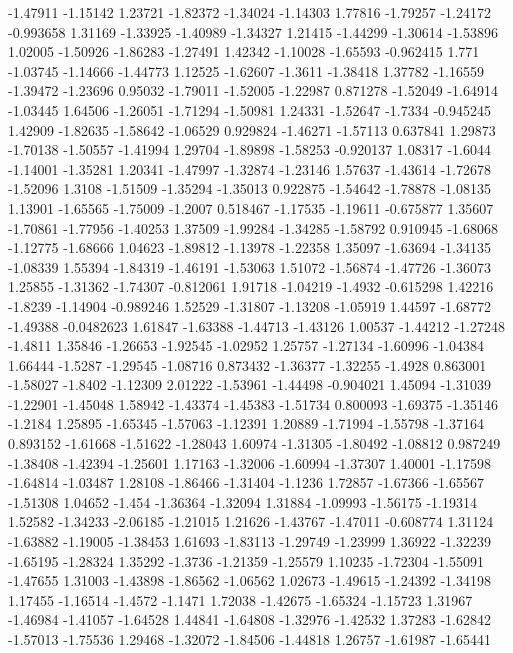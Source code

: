 \documentclass[9pt]{article}
\theoremstyle{plain}
\theoremstyle{definition}
\theoremstyle{remark}
\numberwithin{equation}{section}
\begin{document}
-1.47911
-1.15142
1.23721
-1.82372
-1.34024
-1.14303
1.77816
-1.79257
-1.24172
-0.993658
1.31169
-1.33925
-1.40989
-1.34327
1.21415
-1.44299
-1.30614
-1.53896
1.02005
-1.50926
-1.86283
-1.27491
1.42342
-1.10028
-1.65593
-0.962415
1.771
-1.03745
-1.14666
-1.44773
1.12525
-1.62607
-1.3611
-1.38418
1.37782
-1.16559
-1.39472
-1.23696
0.95032
-1.79011
-1.52005
-1.22987
0.871278
-1.52049
-1.64914
-1.03445
1.64506
-1.26051
-1.71294
-1.50981
1.24331
-1.52647
-1.7334
-0.945245
1.42909
-1.82635
-1.58642
-1.06529
0.929824
-1.46271
-1.57113
0.637841
1.29873
-1.70138
-1.50557
-1.41994
1.29704
-1.89898
-1.58253
-0.920137
1.08317
-1.6044
-1.14001
-1.35281
1.20341
-1.47997
-1.32874
-1.23146
1.57637
-1.43614
-1.72678
-1.52096
1.3108
-1.51509
-1.35294
-1.35013
0.922875
-1.54642
-1.78878
-1.08135
1.13901
-1.65565
-1.75009
-1.2007
0.518467
-1.17535
-1.19611
-0.675877
1.35607
-1.70861
-1.77956
-1.40253
1.37509
-1.99284
-1.34285
-1.58792
0.910945
-1.68068
-1.12775
-1.68666
1.04623
-1.89812
-1.13978
-1.22358
1.35097
-1.63694
-1.34135
-1.08339
1.55394
-1.84319
-1.46191
-1.53063
1.51072
-1.56874
-1.47726
-1.36073
1.25855
-1.31362
-1.74307
-0.812061
1.91718
-1.04219
-1.4932
-0.615298
1.42216
-1.8239
-1.14904
-0.989246
1.52529
-1.31807
-1.13208
-1.05919
1.44597
-1.68772
-1.49388
-0.0482623
1.61847
-1.63388
-1.44713
-1.43126
1.00537
-1.44212
-1.27248
-1.4811
1.35846
-1.26653
-1.92545
-1.02952
1.25757
-1.27134
-1.60996
-1.04384
1.66444
-1.5287
-1.29545
-1.08716
0.873432
-1.36377
-1.32255
-1.4928
0.863001
-1.58027
-1.8402
-1.12309
2.01222
-1.53961
-1.44498
-0.904021
1.45094
-1.31039
-1.22901
-1.45048
1.58942
-1.43374
-1.45383
-1.51734
0.800093
-1.69375
-1.35146
-1.2184
1.25895
-1.65345
-1.57063
-1.12391
1.20889
-1.71994
-1.55798
-1.37164
0.893152
-1.61668
-1.51622
-1.28043
1.60974
-1.31305
-1.80492
-1.08812
0.987249
-1.38408
-1.42394
-1.25601
1.17163
-1.32006
-1.60994
-1.37307
1.40001
-1.17598
-1.64814
-1.03487
1.28108
-1.86466
-1.31404
-1.1236
1.72857
-1.67366
-1.65567
-1.51308
1.04652
-1.454
-1.36364
-1.32094
1.31884
-1.09993
-1.56175
-1.19314
1.52582
-1.34233
-2.06185
-1.21015
1.21626
-1.43767
-1.47011
-0.608774
1.31124
-1.63882
-1.19005
-1.38453
1.61693
-1.83113
-1.29749
-1.23999
1.36922
-1.32239
-1.65195
-1.28324
1.35292
-1.3736
-1.21359
-1.25579
1.10235
-1.72304
-1.55091
-1.47655
1.31003
-1.43898
-1.86562
-1.06562
1.02673
-1.49615
-1.24392
-1.34198
1.17455
-1.16514
-1.4572
-1.1471
1.72038
-1.42675
-1.65324
-1.15723
1.31967
-1.46984
-1.41057
-1.64528
1.44841
-1.64808
-1.32976
-1.42532
1.37283
-1.62842
-1.57013
-1.75536
1.29468
-1.32072
-1.84506
-1.44818
1.26757
-1.61987
-1.65441
\end{document}
